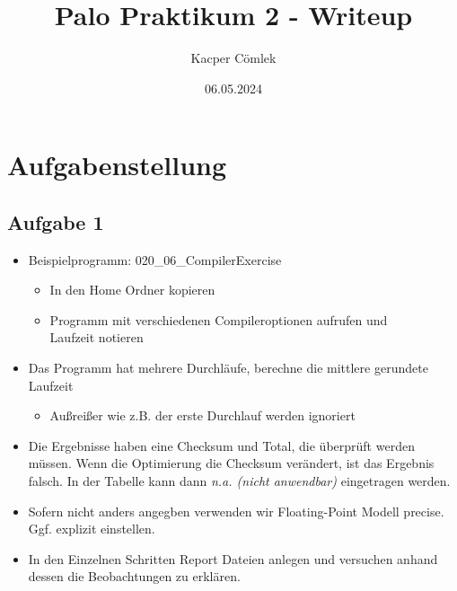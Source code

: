 \documentclass{article}
\author{Kacper Cömlek}
\title{Palo Praktikum 2 - Writeup}
\date{06.05.2024}
\begin{document}
\maketitle
\tableofcontents 


\section{Aufgabenstellung}

  \subsection{Aufgabe 1}
  
  \begin{itemize}
  
  \item Beispielprogramm: 020\_06\_CompilerExercise
  
  \begin{itemize}
  \item In den Home Ordner kopieren
  \item Programm mit verschiedenen Compileroptionen aufrufen und \\Laufzeit notieren
  \end{itemize}

  \item Das Programm hat mehrere Durchläufe, berechne die mittlere gerundete Laufzeit
  
  \begin{itemize}
  \item Außreißer wie z.B. der erste Durchlauf werden ignoriert
  \end{itemize}

  \item Die Ergebnisse haben eine Checksum und Total, die überprüft werden müssen. 
    Wenn die Optimierung die Checksum verändert, ist das Ergebnis falsch. 
    In der Tabelle kann dann \emph{n.a. (nicht anwendbar)} eingetragen werden.

  \item Sofern nicht anders angegben verwenden wir Floating-Point Modell precise. 
    Ggf. explizit einstellen. 
  
  \item In den Einzelnen Schritten Report Dateien anlegen und versuchen anhand 
    dessen die Beobachtungen zu erklären. 
  \end{itemize}
\end{document}
